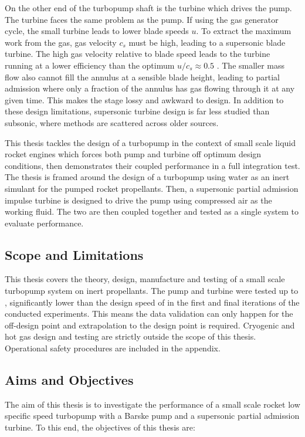 On the other end of the turbopump shaft is the turbine which drives the pump. The turbine faces the same problem as the pump. If using the gas generator cycle, the small turbine leads to lower blade speeds $u$. To extract the maximum work from the gas, gas velocity $c_s$ must be high, leading to a supersonic blade turbine. The high gas velocity relative to blade speed leads to the turbine running at a lower efficiency than the optimum $u/c_s \approx 0.5$ \cite{LiquidRocketEngine1974}. The smaller mass flow also cannot fill the annulus at a sensible blade height, leading to partial admission where only a fraction of the annulus has gas flowing through it at any given time. This makes the stage lossy and awkward to design. In addition to these design limitations, supersonic turbine design is far less studied than subsonic, where methods are scattered across older sources.%

This thesis tackles the design of a turbopump in the context of small scale liquid rocket engines which forces both pump and turbine off optimum design conditions, then demonstrates their coupled performance in a full integration test. The thesis is framed around the design of a \valPumpRpmDesign turbopump using water as an inert simulant for the pumped rocket propellants. Then, a supersonic partial admission impulse turbine is designed to drive the pump using compressed air as the working fluid. The two are then coupled together and tested as a single system to evaluate performance.

\subsection{Scope and Limitations}

This thesis covers the theory, design, manufacture and testing of a small scale turbopump system on inert propellants. The pump and turbine were tested up to \valPumpRpmMaxreached, significantly lower than the design speed of \valPumpRpmDesign in the first and final iterations of the conducted experiments. This means the data validation can only happen for the off-design point and extrapolation to the design point is required. Cryogenic and hot gas design and testing are strictly outside the scope of this thesis. Operational safety procedures are included in the appendix.

\subsection{Aims and Objectives}
\label{sec:intro_objectives}
The aim of this thesis is to investigate the performance of a small scale rocket low specific speed turbopump with a Barske pump and a supersonic partial admission turbine. To this end, the objectives of this thesis are:

